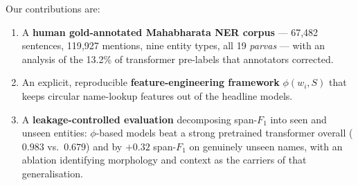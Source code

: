 \documentclass[conference]{IEEEtran}
\begin{document}
Our contributions are:
\begin{enumerate}
    \item A \textbf{human gold-annotated Mahabharata NER corpus} --- 67{,}482 sentences, 119{,}927 mentions, nine entity types, all 19 \emph{parvas} --- with an analysis of the 13.2\% of transformer pre-labels that annotators corrected.
    \item An explicit, reproducible \textbf{feature-engineering framework} $\phi(w_i,S)$ that keeps circular name-lookup features out of the headline models.
    \item A \textbf{leakage-controlled evaluation} decomposing span-$F_1$ into seen and unseen entities: $\phi$-based models beat a strong pretrained transformer overall ($0.983$ vs.\ $0.679$) and by $+0.32$ span-$F_1$ on genuinely unseen names, with an ablation identifying morphology and context as the carriers of that generalisation.
\end{enumerate}



	
	
	
\end{document}
